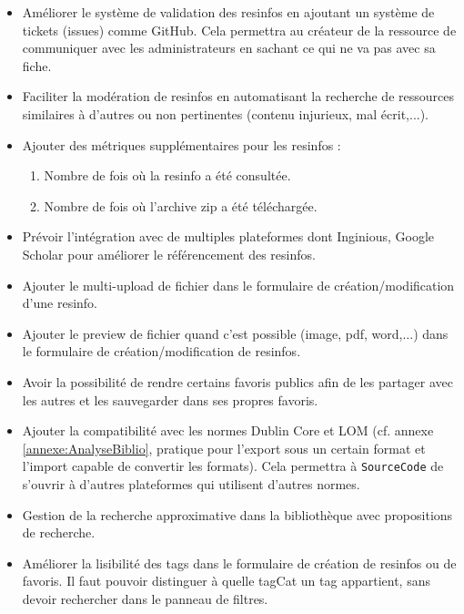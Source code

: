 \begin{itemize}
    \item Améliorer le système de validation des \glspl{resinfo} en ajoutant un système de tickets (issues) comme GitHub. Cela permettra au créateur de la ressource de communiquer avec les administrateurs en sachant ce qui ne va pas avec sa \gls{fiche}.
    \item Faciliter la modération de \glspl{resinfo} en automatisant la recherche de ressources similaires à d'autres ou non pertinentes (contenu injurieux, mal écrit,...).
    \item Ajouter des métriques supplémentaires pour les \glspl{resinfo} :
    \begin{enumerate}
        \item Nombre de fois où la \gls{resinfo} a été consultée.
        \item Nombre de fois où l'archive zip a été téléchargée.
    \end{enumerate}
    \item Prévoir l'intégration avec de multiples plateformes dont Inginious, Google Scholar pour améliorer le référencement des \glspl{resinfo}.
    \item Ajouter le multi-upload de fichier dans le formulaire de création/modification d'une \gls{resinfo}.
    \item Ajouter le preview de fichier quand c'est possible (image, pdf, word,...) dans le formulaire de création/modification de \glspl{resinfo}.
    \item Avoir la possibilité de rendre certains favoris publics afin de les partager avec les autres et les sauvegarder dans ses propres favoris.
    \item Ajouter la compatibilité avec les normes Dublin Core et LOM (cf. annexe \ref{annexe:AnalyseBiblio}, pratique pour l'export sous un certain format et l'import capable de convertir les formats). Cela permettra à \texttt{SourceCode} de s'ouvrir à d'autres plateformes qui utilisent d'autres normes.
    \item Gestion de la recherche approximative dans la bibliothèque avec propositions de recherche.
    \item Améliorer la lisibilité des \glspl{tag} dans le formulaire de création de \glspl{resinfo} ou de favoris. Il faut pouvoir distinguer à quelle \gls{tagCat} un \gls{tag} appartient, sans devoir rechercher dans le panneau de filtres.

\end{itemize}
